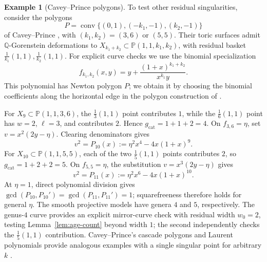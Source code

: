 \documentclass[11pt]{article}
\theoremstyle{plain}
\theoremstyle{definition}
\newtheorem{example}[theorem]{Example}
\theoremstyle{remark}
\newcommand{\Q}{\mathbb Q}
\newcommand{\Pj}{\mathbb P}
\newcommand{\1}{\mathbf 1}
\begin{document}
\begin{example}[Cavey--Prince polygons]\label{ex:cavey-prince}
To test other residual singularities, consider the polygons
\[
P=\operatorname{conv}\{(0,1),(-k_1,-1),(k_2,-1)\}
\]
of Cavey--Prince \cite[Proposition 7.1 and Remark 7.2]{CP}, with $(k_1,k_2)=(3,6)$ or $(5,5)$.  Their toric surfaces admit $\Q$-Gorenstein deformations to $X_{k_1+k_2}\subset\Pj(1,1,k_1,k_2)$, with residual basket $\frac1{k_1}(1,1),\frac1{k_2}(1,1)$.  For explicit curve checks we use the binomial specialization
\[
f_{k_1,k_2}(x,y)=y+\frac{(1+x)^{k_1+k_2}}{x^{k_1}y}.
\]
This polynomial has Newton polygon $P$; we obtain it by choosing the binomial coefficients along the horizontal edge in the polygon construction of \cite{CP}.

For $X_9\subset\Pj(1,1,3,6)$, the $\frac13(1,1)$ point contributes $1$, while the $\frac16(1,1)$ point has $w=2$, $\ell=3$, and contributes $2$.  Hence $g_{\mathrm{cat}}=1+1+2=4$.  On $f_{3,6}=\eta$, set $v=x^2(2y-\eta)$.  Clearing denominators gives
\[
v^2=P_{10}(x):=\eta^2x^4-4x(1+x)^9.
\]
For $X_{10}\subset\Pj(1,1,5,5)$, each of the two $\frac15(1,1)$ points contributes $2$, so $g_{\mathrm{cat}}=1+2+2=5$.  On $f_{5,5}=\eta$, the substitution $v=x^3(2y-\eta)$ gives
\[
v^2=P_{11}(x):=\eta^2x^6-4x(1+x)^{10}.
\]
At $\eta=1$, direct polynomial division gives $\gcd(P_{10},P_{10}')=\gcd(P_{11},P_{11}')=1$; squarefreeness therefore holds for general $\eta$.  The smooth projective models have genera $4$ and $5$, respectively.  The genus-$4$ curve provides an explicit mirror-curve check with residual width $w_0=2$, testing Lemma~\ref{lem:age-count} beyond width $1$; the second independently checks the $\frac15(1,1)$ contribution.  Cavey--Prince's cascade polygons and Laurent polynomials provide analogous examples with a single singular point for arbitrary $k$ \cite[Table 8.1]{CP}.
\end{example}
\end{document}
